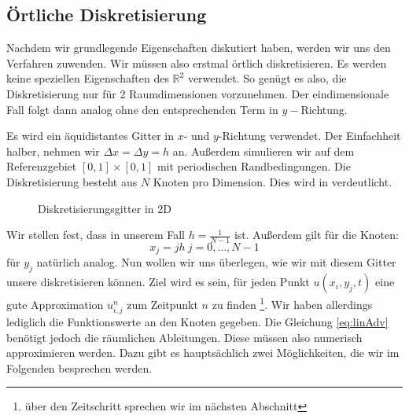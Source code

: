 \documentclass[12pt,a4paper]{scrartcl}
\numberwithin{equation}{section} %
\theoremstyle{definition}
\theoremstyle{plain}
\newcommand{\rr}{\mathbb{R}}
\begin{document}
\subsection{Örtliche Diskretisierung}
Nachdem wir grundlegende Eigenschaften diskutiert haben, werden wir uns den Verfahren zuwenden. Wir müssen also  erstmal örtlich diskretisieren. Es werden  keine speziellen Eigenschaften des $\rr^2$ verwendet. So genügt es also, die Diskretisierung nur für 2 Raumdimensionen vorzunehmen. Der eindimensionale Fall folgt dann analog ohne den entsprechenden Term in $y-$Richtung.
\par Es wird ein äquidistantes Gitter in $x$- und $y$-Richtung verwendet. Der Einfachheit halber, nehmen wir $\Delta x=\Delta y=h$ an. Außerdem simulieren wir auf dem Referenzgebiet $[0,1]\times[0,1]$ mit periodischen Randbedingungen. Die Diskretisierung besteht aus $N$ Knoten pro Dimension. Dies wird in  verdeutlicht.
\begin{figure}
\centering
{}
\caption{Diskretisierungsgitter in 2D}
\label{fig:Diskretgit}
\end{figure}
Wir stellen fest, dass in unserem Fall $h=\frac{1}{N-1}$ ist. Außerdem gilt für die Knoten:
\begin{equation}
x_j=jh~j=0,\dotsc,N-1
\end{equation} für $y_j$ natürlich analog.
Nun wollen wir uns überlegen, wie wir mit diesem Gitter unsere  diskretisieren können. Ziel wird es sein, für jeden Punkt $u(x_i,y_j,t)$ eine gute Approximation $u^n_{i,j}$ zum Zeitpunkt $n$ zu finden \footnote{über den Zeitschritt sprechen wir im nächsten Abschnitt}. Wir haben allerdings lediglich die Funktionswerte an den Knoten gegeben. Die Gleichung \eqref{eq:linAdv} benötigt jedoch die räumlichen Ableitungen. Diese müssen also numerisch approximieren werden. Dazu gibt es hauptsächlich zwei Möglichkeiten, die wir im Folgenden besprechen werden.
\end{document}

